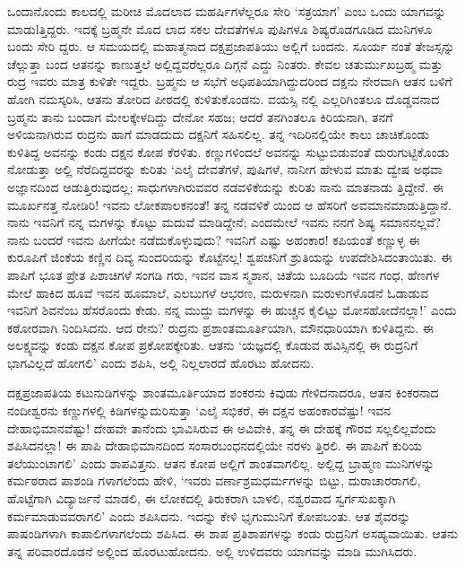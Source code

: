 ಒಂದಾನೊಂದು ಕಾಲದಲ್ಲಿ ಮರೀಚಿ ಮೊದಲಾದ ಮಹರ್ಷಿಗಳೆಲ್ಲರೂ ಸೇರಿ ‘ಸತ್ರಯಾಗ’ ಎಂಬ ಒಂದು ಯಾಗವನ್ನು ಮಾಡುlತ್ತಿದ್ದರು. ಇದಕ್ಕೆ ಬ್ರಹ್ಮನೇ ಮೊದ ಲಾದ ಸಕಲ ದೇವತೆಗಳೂ ಪುಷಿಗಳೂ ಶಿಷ್ಯರೊಡಗೂಡಿದ ಮುನಿಗಳೂ ಬಂದು ಸೇರಿ ದ್ದರು. ಆ ಸಮಯದಲ್ಲಿ ಮಹಾತ್ಮನಾದ ದಕ್ಷಪ್ರಜಾಪತಿಯು ಅಲ್ಲಿಗೆ ಬಂದನು. ಸೂರ್ಯ ನಂತೆ ತೇಜಸ್ಸನ್ನು ಚೆಲ್ಲುತ್ತಾ ಬಂದ ಆತನನ್ನು ಕಾಣುತ್ತಲೆ ಅಲ್ಲಿದ್ದವರೆಲ್ಲರೂ ದಿಗ್ಗನೆ ಎದ್ದು ನಿಂತರು. ಕೇವಲ ಚತುರ್ಮುಖಬ್ರಹ್ಮ ಮತ್ತು ರುದ್ರ ಇವರು ಮಾತ್ರ ಕುಳಿತೇ ಇದ್ದರು. ಬ್ರಹ್ಮನು ಆ ಸಭೆಗೆ ಅಧಿಪತಿಯಾಗಿದ್ದುದರಿಂದ ದಕ್ಷನು ನೇರವಾಗಿ ಆತನ ಬಳಿಗೆ ಹೋಗಿ ನಮಸ್ಕರಿಸಿ, ಆತನು ತೋರಿದ ಪೀಠದಲ್ಲಿ ಕುಳಿತುಕೊಂಡನು. ವಯಸ್ಸಿ ನಲ್ಲಿ ಎಲ್ಲರಿಗಿಂತಲೂ ದೊಡ್ಡವನಾದ ಬ್ರಹ್ಮನು ತಾನು ಬಂದಾಗ ಮೇಲಕ್ಕೇಳದಿದ್ದು ದೇನೋ ಸಹಜ; ಆದರೆ ತನಗಿಂತಲೂ ಕಿರಿಯನಾಗಿ, ತನಗೆ ಅಳಿಯನಾಗಿರುವ ರುದ್ರನು ಹಾಗೆ ಮಾಡದುದು ದಕ್ಷನಿಗೆ ಸಹಿಸಲಿಲ್ಲ. ತನ್ನ ಇದಿರಿನಲ್ಲಿಯೇ ಕಾಲು ಚಾಚಿಕೊಂಡು ಕುಳಿತಿದ್ದ ಅವನನ್ನು ಕಂಡು ದಕ್ಷನ ಕೋಪ ಕೆರಳಿತು. ಕಣ್ಣುಗಳಿಂದಲೆ ಅವನನ್ನು ಸುಟ್ಟುಬಿಡುವಂತೆ ದುರುಗುಟ್ಟಿಕೊಂಡು ನೋಡುತ್ತಾ ಅಲ್ಲಿ ನೆರೆದಿದ್ದವರನ್ನು ಕುರಿತು ‘ಎಲೈ ದೇವತೆಗಳೆ, ಪುಷಿಗಳೆ, ನಾನೀಗ ಹೇಳುವ ಮಾತು ದ್ವೇಷ ಅಥವಾ ಅಜ್ಞಾನದಿಂದ ಆಡುತ್ತಿರುವುದಲ್ಲ; ಸಾಧುಗಳಾಗಿರುವವರ ನಡವಳಿಕೆಯನ್ನು ಕುರಿತು ನಾನು ಮಾತನಾಡು ತ್ತಿದ್ದೇನೆ. ಈ ಮೂರ್ಖನತ್ತ ನೋಡಿರಿ! ಇವನು ಲೋಕಪಾಲಕನಂತೆ! ತನ್ನ ನಡವಳಿಕೆ ಯಿಂದ ಆ ಹೆಸರಿಗೆ ಅವಮಾನಮಾಡುತ್ತಿದ್ದಾನೆ. ನಾನು ಇವನಿಗೆ ನನ್ನ ಮಗಳನ್ನು ಕೊಟ್ಟು ಮದುವೆ ಮಾಡಿದ್ದೇನೆ; ಎಂದಮೇಲೆ ಇವನು ನನಗೆ ಶಿಷ್ಯ ಸಮಾನನಲ್ಲವೆ? ನಾನು ಬಂದರೆ ಇವನು ಹೀಗೆಯೇ ನಡೆದುಕೊಳ್ಳುವುದು? ಇವನಿಗೆ ಎಷ್ಟು ಅಹಂಕಾರ! ಕಪಿಯಂತೆ ಕಣ್ಣುಳ್ಳ ಈ ಕುರೂಪಿಗೆ ಜಿಂಕೆಯ ಕಣ್ಣಿನ ದಿವ್ಯ ಸುಂದರಿಯನ್ನು ಕೊಟ್ಟೆನಲ್ಲ! ಶ್ವಪಚನಿಗೆ ಶ್ರುತಿಯನ್ನು ಉಪದೇಶಿಸಿದಂತಾಯಿತು. ಈ ಪಾಪಿಗೆ ಭೂತ ಪ್ರೇತ ಪಿಶಾಚಿಗಳೆ ಸಂಗಡಿ ಗರು, ಇವನ ವಾಸ ಸ್ಮಶಾನ, ಚಿತೆಯ ಬೂದಿಯೆ ಇವನ ಗಂಧ, ಹೆಣಗಳ ಮೇಲೆ ಹಾಕಿದ ಹೂವೆ ಇವನ ಹೂಮಾಲೆ, ಎಲಬುಗಳೆ ಆಭರಣ, ಮರುಳನಾಗಿ ಮರುಳುಗಳೊಡನೆ ಓಡಾಡುವ ಇವನಿಗೆ ಶಿವನೆಂಬ ಹೆಸರೊಂದು ಕೇಡು. ನನ್ನ ಮುದ್ದು ಮಗಳನ್ನು ಈ ಹುಚ್ಚನ ಕೈಲಿಟ್ಟು ಮೋಸಹೋದೆನಲ್ಲಾ!’ ಎಂದು ಕಠೋರವಾಗಿ ನಿಂದಿಸಿದನು. ಆದ ರೇನು? ರುದ್ರನು ಪ್ರಶಾಂತಮೂರ್ತಿಯಾಗಿ, ಮೌನಧಾರಿಯಾಗಿ ಕುಳಿತಿದ್ದನು. ಈ ಅಲಕ್ಷ್ಯವನ್ನು ಕಂಡು ದಕ್ಷನ ಕೋಪ ಪ್ರಕೋಪಕ್ಕೇರಿತು. ಆತನು ‘ಯಜ್ಞದಲ್ಲಿ ಕೊಡುವ ಹವಿಸ್ಸಿನಲ್ಲಿ ಈ ರುದ್ರನಿಗೆ ಭಾಗವಿಲ್ಲದೆ ಹೋಗಲಿ’ ಎಂದು ಶಪಿಸಿ, ಅಲ್ಲಿ ನಿಲ್ಲಲಾರದೆ ಹೊರಟು ಹೋದನು.

ದಕ್ಷಪ್ರಜಾಪತಿಯ ಕಟುನುಡಿಗಳನ್ನು ಶಾಂತಮೂರ್ತಿಯಾದ ಶಂಕರನು ಕಿವುಡು ಗೇಳಿದನಾದರೂ, ಆತನ ಕಿಂಕರನಾದ ನಂದೀಶ್ವರನು ಕಣ್ಣುಗಳಲ್ಲಿ ಕಿಡಿಗಳನ್ನುದುರಿಸುತ್ತಾ ‘ಎಲೈ ಸಭಿಕರೆ, ಈ ದಕ್ಷನ ಅಹಂಕಾರವೆಷ್ಟು! ಇವನ ದೇಹಾಭಿಮಾನವೆಷ್ಟು! ದೇಹವೇ ತಾನೆಂದು ಭಾವಿಸಿರುವ ಈ ಅವಿವೇಕಿ, ತನ್ನ ಈ ದೇಹಕ್ಕೆ ಗೌರವ ಸಲ್ಲಲಿಲ್ಲವೆಂದು ಶಪಿಸಿದನಲ್ಲಾ! ಈ ಪಾಪಿ ದೇಹಾಭಿಮಾನದಿಂದ ಸಂಸಾರಬಂಧನದಲ್ಲಿಯೇ ನರಳು ತ್ತಿರಲಿ. ಈ ಪಾಪಿಗೆ ಕುರಿಯ ತಲೆಯುಂಟಾಗಲಿ’ ಎಂದು ಶಾಪವಿತ್ತನು. ಆತನ ಕೋಪ ಅಲ್ಲಿಗೆ ಶಾಂತವಾಗಲಿಲ್ಲ. ಅಲ್ಲಿದ್ದ ಬ್ರಾಹ್ಮಣ ಮುನಿಗಳನ್ನು ಕರ್ಮಠರಾದ ಪಾಶಂಡಿ ಗಳಾಗಲೆಂದು ಹೇಳಿ, ‘ಇವರು ವರ್ಣಾಶ್ರಮಧರ್ಮಗಳನ್ನು ಬಿಟ್ಟು, ದುರಾಚಾರರಾಗಲಿ, ಹೊಟ್ಟೆಗಾಗಿ ವಿದ್ಯಾರ್ಜನೆ ಮಾಡಲಿ, ಈ ಲೋಕದಲ್ಲಿ ತಿರುಕರಾಗಿ ಬಾಳಲಿ, ನಶ್ವರವಾದ ಸ್ವರ್ಗಸುಖಕ್ಕಾಗಿ ಕರ್ಮಮಾಡುವವರಾಗಲಿ’ ಎಂದು ಶಪಿಸಿದನು. ಇದನ್ನು ಕೇಳಿ ಭೃಗುಮುನಿಗೆ ಕೋಪಬಂತು. ಆತ ಶೈವರನ್ನು ಪಾಷಂಡಿಗಳಾಗಿ ಕಾಪಾಲಿಗಳಾಗಲೆಂದು ಶಪಿಸಿದ. ಈ ಶಾಪ ಪ್ರತಿಶಾಪಗಳನ್ನು ಕಂಡು ರುದ್ರನಿಗೆ ಅಸಹ್ಯವಾಯಿತು. ಆತನು ತನ್ನ ಪರಿವಾರದೊಡನೆ ಅಲ್ಲಿಂದ ಹೊರಟುಹೋದನು. ಅಲ್ಲಿ ಉಳಿದವರು ಯಾಗವನ್ನು ಮಾಡಿ ಮುಗಿಸಿದರು.

